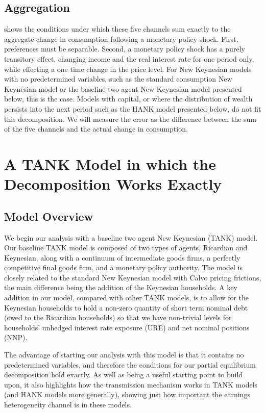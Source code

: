\documentclass[12pt,a4paper]{article}
\begin{document}
\subsection{Aggregation}
\cite{auclert_monetary_2017} shows the conditions under which these five channels sum exactly to the aggregate change in consumption following a monetary policy shock. First, preferences must be separable. Second, a monetary policy shock has a purely transitory effect, changing income and the real interest rate for one period only, while effecting a one time change in the price level. For New Keynesian models with no predetermined variables, such as the standard consumption New Keynesian model or the baseline two agent New Keynesian model presented below, this is the case. Models with capital, or where the distribution of wealth persists into the next period such as the HANK model presented below, do not fit this decomposition. We will measure the error as the difference between the sum of the five channels and the actual change in consumption.


\section{A TANK Model in which the Decomposition Works Exactly}

\subsection{Model Overview}
We begin our analysis with a baseline two agent New Keynesian (TANK) model. Our baseline TANK model is composed of two types of agents, Ricardian and Keynesian, along with a continuum of intermediate goods firms, a perfectly competitive final goods firm, and a monetary policy authority. The model is closely related to the standard New Keynesian model with Calvo pricing frictions, the main difference being the addition of the Keynesian households. A key addition in our model, compared with other TANK models, is to allow for the Keynesian households to hold a non-zero quantity of short term nominal debt (owed to the Ricardian households) so that we have non-trivial levels for households' unhedged interest rate exposure (URE) and net nominal positions (NNP).

The advantage of starting our analysis with this model is that it contains no predetermined variables, and therefore the conditions for our partial equilibrium decomposition hold exactly. As well as being a useful starting point to build upon, it also highlights how the transmission mechanism works in TANK models (and HANK models more generally), showing just how important the earnings heterogeneity channel is in these models.
\end{document}
